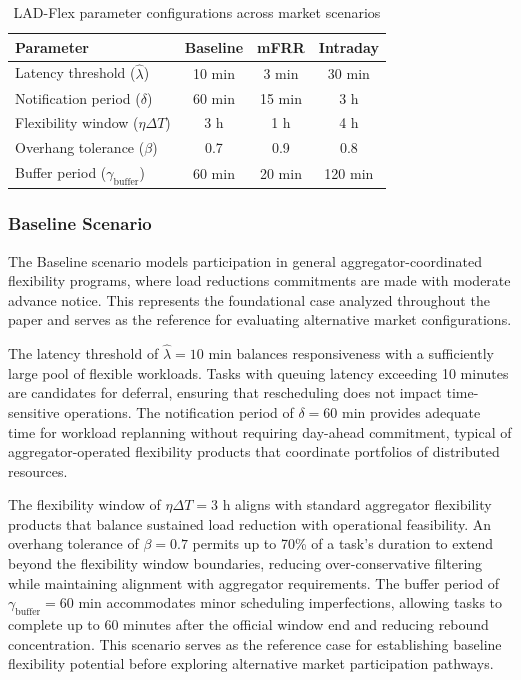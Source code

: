 \documentclass[preprint,12pt]{elsarticle}
\begin{document}
\begin{table}[htbp]
\centering
\caption{LAD-Flex parameter configurations across market scenarios}
\label{tab:scenario_parameters}
\begin{tabular}{lccc}
\toprule
\textbf{Parameter} & \textbf{Baseline} & \textbf{mFRR} & \textbf{Intraday} \\
\midrule
Latency threshold ($\hat{\lambda}$) & 10 min & 3 min & 30 min \\
Notification period ($\delta$) & 60 min & 15 min & 3 h \\
Flexibility window ($\eta\Delta T$) & 3 h & 1 h & 4 h \\
Overhang tolerance ($\beta$) & 0.7 & 0.9 & 0.8 \\
Buffer period ($\gamma_{\text{buffer}}$) & 60 min & 20 min & 120 min \\
\bottomrule
\end{tabular}
\end{table}

\subsubsection{Baseline Scenario}
The Baseline scenario models participation in general aggregator-coordinated flexibility programs, where load reductions commitments are made with moderate advance notice. This represents the foundational case analyzed throughout the paper and serves as the reference for evaluating alternative market configurations.

The latency threshold of $\hat{\lambda} = 10$ min balances responsiveness with a sufficiently large pool of flexible workloads. Tasks with queuing latency exceeding 10 minutes are candidates for deferral, ensuring that rescheduling does not impact time-sensitive operations. The notification period of $\delta = 60$ min provides adequate time for workload replanning without requiring day-ahead commitment, typical of aggregator-operated flexibility products that coordinate portfolios of distributed resources.

The flexibility window of $\eta\Delta T = 3$ h aligns with standard aggregator flexibility products that balance sustained load reduction with operational feasibility. An overhang tolerance of $\beta = 0.7$ permits up to 70\% of a task's duration to extend beyond the flexibility window boundaries, reducing over-conservative filtering while maintaining alignment with aggregator requirements. The buffer period of $\gamma_{\text{buffer}} = 60$ min accommodates minor scheduling imperfections, allowing tasks to complete up to 60 minutes after the official window end and reducing rebound concentration. This scenario serves as the reference case for establishing baseline flexibility potential before exploring alternative market participation pathways.
\end{document}
